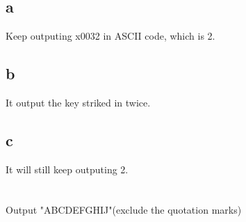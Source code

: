 \documentclass[11pt,a4paper]{article}
\begin{document}
	\section{}
	\subsection*{a}
	Keep outputing x0032 in ASCII code, which is 2.\par
	\subsection*{b}
	It output the key striked in twice.\par
	\subsection*{c}
	It will still keep outputing 2.\par
	
	\section{}
	Output "ABCDEFGHIJ"(exclude the quotation marks)\par
	
	
		
\end{document}
